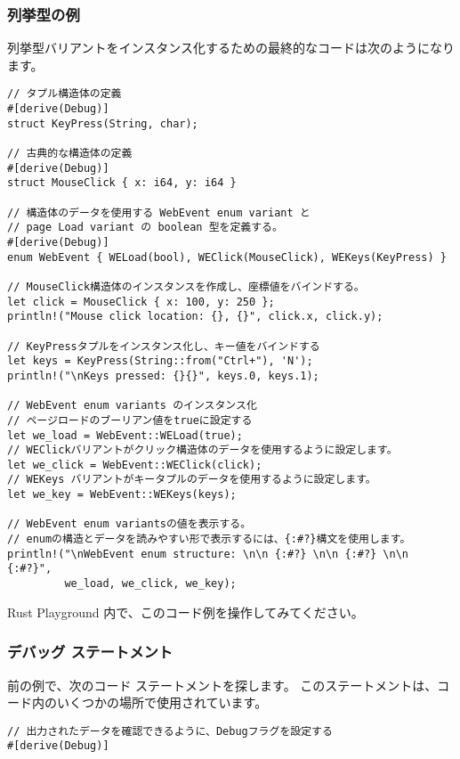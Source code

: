\subsubsection{列挙型の例}

列挙型バリアントをインスタンス化するための最終的なコードは次のようになります。

\begin{lstlisting}[numbers=none]
// タプル構造体の定義
#[derive(Debug)]
struct KeyPress(String, char);

// 古典的な構造体の定義
#[derive(Debug)]
struct MouseClick { x: i64, y: i64 }

// 構造体のデータを使用する WebEvent enum variant と
// page Load variant の boolean 型を定義する。
#[derive(Debug)]
enum WebEvent { WELoad(bool), WEClick(MouseClick), WEKeys(KeyPress) }

// MouseClick構造体のインスタンスを作成し、座標値をバインドする。
let click = MouseClick { x: 100, y: 250 };
println!("Mouse click location: {}, {}", click.x, click.y);
    
// KeyPressタプルをインスタンス化し、キー値をバインドする
let keys = KeyPress(String::from("Ctrl+"), 'N');
println!("\nKeys pressed: {}{}", keys.0, keys.1);
    
// WebEvent enum variants のインスタンス化
// ページロードのブーリアン値をtrueに設定する
let we_load = WebEvent::WELoad(true);
// WEClickバリアントがクリック構造体のデータを使用するように設定します。
let we_click = WebEvent::WEClick(click);
// WEKeys バリアントがキータプルのデータを使用するように設定します。
let we_key = WebEvent::WEKeys(keys);
    
// WebEvent enum variantsの値を表示する。
// enumの構造とデータを読みやすい形で表示するには、{:#?}構文を使用します。
println!("\nWebEvent enum structure: \n\n {:#?} \n\n {:#?} \n\n {:#?}",
         we_load, we_click, we_key);
\end{lstlisting}

Rust Playground 内で、このコード例を操作してみてください。

\subsubsection{デバッグ ステートメント}

前の例で、次のコード ステートメントを探します。 このステートメントは、コード内のいくつかの場所で使用されています。

\begin{lstlisting}[numbers=none]
// 出力されたデータを確認できるように、Debugフラグを設定する
#[derive(Debug)]
\end{lstlisting}

